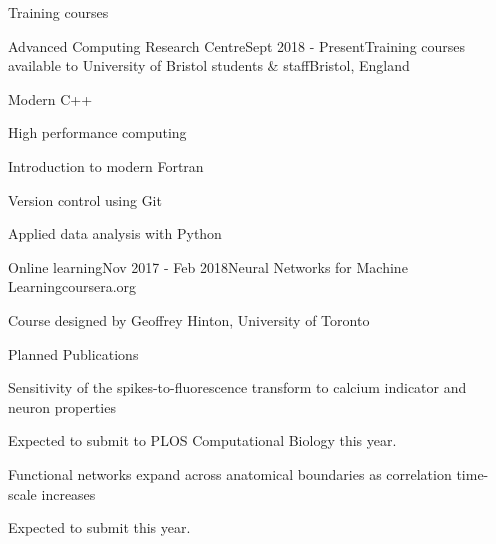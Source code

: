 \documentclass{resume} %
\begin{document}
\begin{rSection}{Training courses}
  \begin{rSubsection}{Advanced Computing Research Centre}{Sept 2018 - Present}{Training courses available to University of Bristol students \& staff}{Bristol, England}
    \item Modern C++%
    \item High performance computing%
    \item Introduction to modern Fortran
    \item Version control using Git
    \item Applied data analysis with Python
  \end{rSubsection}

  \begin{rSubsection}{Online learning}{Nov 2017 - Feb 2018}{Neural Networks for Machine Learning}{coursera.org}
    \item Course designed by Geoffrey Hinton, University of Toronto 
  \end{rSubsection}
\end{rSection}


\begin{rSection}{Planned Publications}
  \begin{rSubsection}{Sensitivity of the spikes-to-fluorescence transform to calcium indicator and neuron properties}{}{}{}
    \item Expected to submit to PLOS Computational Biology this year.
  \end{rSubsection}

  \begin{rSubsection}{Functional networks expand across anatomical boundaries as correlation time-scale increases}{}{}{}
    \item Expected to submit this year.
  \end{rSubsection}
\end{rSection}

\newpage
\end{document}
